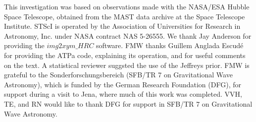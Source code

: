 \documentclass[12pt,preprint]{aastex}
\begin{document}

\acknowledgments

This investigation was based on observations made with the NASA/ESA
Hubble Space Telescope, obtained from the MAST data archive at the
Space Telescope Institute. STScI is operated by the
Association of Universities for Research in Astronomy, Inc. under 
NASA contract NAS 5-26555.
We thank Jay Anderson for providing the $img2xym\_HRC$ software.
FMW thanks Guillem Anglada Escud\'e for providing the ATPa code, explaining
its operation, and for useful comments on the text.
A statistical reviewer suggsted the use of the Jeffreys prior.
FMW is grateful to the Sonderforschungsbereich
(SFB/TR 7 on Gravitational Wave Astronomy), 
which is funded by the German Research Foundation (DFG),
for support during a visit to Jena, where much of this work was completed.
VVH, TE, and RN would like to thank DFG for
support in SFB/TR 7 on Gravitational Wave Astronomy.
\end{document}
